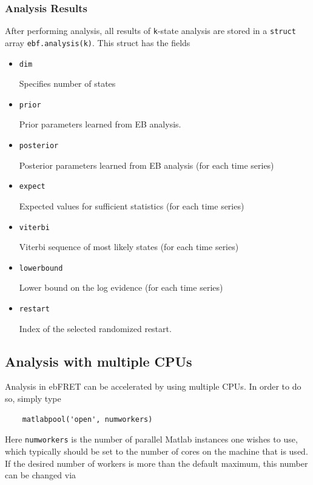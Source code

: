 \documentclass[12pt,article,oldfontcommands]{memoir}
\begin{document}
\subsubsection{Analysis Results}

After performing analysis, all results of \texttt{k}-state analysis are stored in a \texttt{struct} array \texttt{ebf.analysis(k)}. This struct has the fields

\begin{itemize}
\item \texttt{dim}

Specifies number of states

\item \texttt{prior}

Prior parameters learned from EB analysis.

\item \texttt{posterior}

Posterior parameters learned from EB analysis (for each time series)

\item \texttt{expect}

Expected values for sufficient statistics (for each time series)

\item \texttt{viterbi}

Viterbi sequence of most likely states (for each time series)

\item \texttt{lowerbound}

Lower bound on the log evidence (for each time series)

\item \texttt{restart}

Index of the selected randomized restart.

\end{itemize}


\subsection{Analysis with multiple CPUs}

Analysis in ebFRET can be accelerated by using multiple CPUs. In order to do so, simply type 
\begin{verbatim}
    matlabpool('open', numworkers)
\end{verbatim}
Here \texttt{numworkers} is the number of parallel Matlab instances one wishes to use, which typically should be set to the number of cores on the machine that is used. If the desired number of workers is more than the default maximum, this number can be changed via
\end{document}
